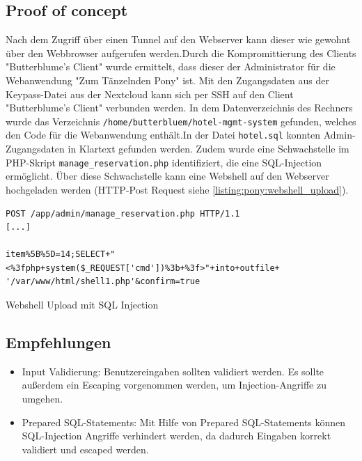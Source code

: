 \subsection*{Proof of concept}
Nach dem Zugriff über einen Tunnel auf den Webserver kann dieser wie gewohnt über den Webbrowser aufgerufen werden.Durch die Kompromittierung des Clients "Butterblume's Client" wurde ermittelt, dass dieser der Administrator für die Webanwendung "Zum Tänzelnden Pony" ist. Mit den Zugangsdaten aus der Keypass-Datei aus der Nextcloud kann sich per SSH auf den Client "Butterblume's Client" verbunden werden. In dem Datenverzeichnis des Rechners wurde das Verzeichnis \texttt{/home/butterbluem/hotel-mgmt-system} gefunden, welches den Code für die Webanwendung enthält.In der Datei \texttt{hotel.sql} konnten Admin-Zugangsdaten in Klartext gefunden werden. Zudem wurde eine Schwachstelle im PHP-Skript \texttt{manage\_reservation.php} identifiziert, die eine SQL-Injection ermöglicht. Über diese Schwachstelle kann eine Webshell auf den Webserver hochgeladen werden (HTTP-Post Request siehe \autoref{listing:pony:webshell_upload}). 
\begin{listing}[!ht]
\begin{verbatim}
POST /app/admin/manage_reservation.php HTTP/1.1 
[...]

item%5B%5D=14;SELECT+"<%3fphp+system($_REQUEST['cmd'])%3b+%3f>"+into+outfile+ '/var/www/html/shell1.php'&confirm=true
\end{verbatim}
\caption{Webshell Upload mit SQL Injection}
\label{listing:pony:webshell_upload}
\end{listing}

\subsection*{Empfehlungen}
\begin{itemize}
    \item Input Validierung: Benutzereingaben sollten validiert werden. Es sollte außerdem ein Escaping vorgenommen werden, um Injection-Angriffe zu umgehen.
    \item Prepared SQL-Statements: Mit Hilfe von Prepared SQL-Statements können SQL-Injection Angriffe verhindert werden, da dadurch Eingaben korrekt validiert und escaped werden.
\end{itemize}


